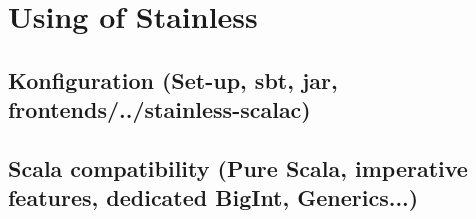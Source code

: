 \chapter{Using of Stainless}
\label{chap:using_stainless}

\section{Konfiguration (Set-up, sbt, jar, frontends/../stainless-scalac)}

\section{Scala compatibility (Pure Scala, imperative features, dedicated BigInt, Generics...)}

